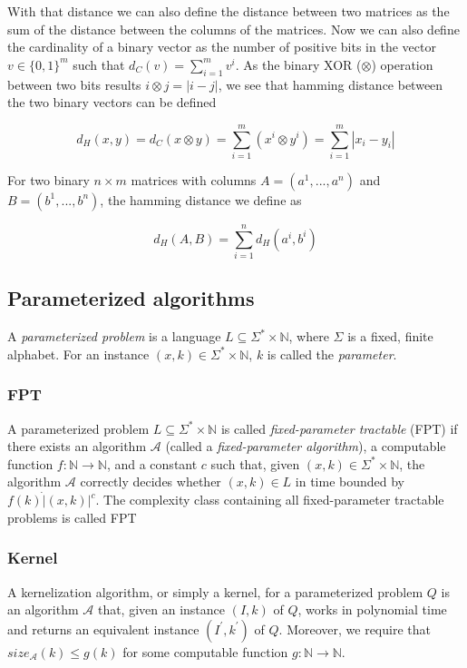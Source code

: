 \documentclass[a4paper]{article}
\begin{document}
With that distance we can
also define the distance between two matrices as the sum of the distance between the columns of
the matrices. Now we can also define the cardinality of a binary vector as the number of positive bits in
the vector $v \in \{0,1\}^m$ such that $d_C(v)=\sum_{i = 1}^{m} v^i$. As the binary XOR ($\otimes$)
operation between two bits results $i \otimes j = |i - j|$, we see that hamming distance between
the two binary vectors can be defined

\[
    d_H(x, y) = d_C(x \otimes y) =\sum_{i = 1}^{m} (x^i \otimes y^i) = \sum_{i = 1}^{m} |x_i - y_i|
\]

For two binary $n \times m$ matrices with columns $A=(a^1,...,a^n)$ and
$B=(b^1,...,b^n)$, the hamming distance we define as

\[
    d_H(A,B) = \sum_{i = 1}^{n} d_H(a^i, b^i)
\]

\subsection{Parameterized algorithms}
\begin{theoremdefinition}
    A \textit{parameterized problem} is a language $L \subseteq \Sigma^* \times \mathbb{N}$,
    where $\Sigma$ is a fixed, finite alphabet. For an instance $(x,k) \in \Sigma^* \times \mathbb{N}$,
    $k$ is called the \textit{parameter}.
\end{theoremdefinition}\cite[p.~12]{param_algo_book}

\subsubsection{FPT}
\begin{theoremdefinition}
    A parameterized problem $L \subseteq \Sigma^* \times \mathbb{N}$ is called
    \textit{fixed-parameter tractable} (FPT) if there exists an algorithm $\mathcal{A}$ (called
    a \textit{fixed-parameter algorithm}), a computable function $f:\mathbb{N} \rightarrow \mathbb{N}$,
    and a constant $c$ such that, given $(x,k) \in \Sigma^* \times \mathbb{N}$, the algorithm
    $\mathcal{A}$ correctly decides whether $(x,k) \in L$ in time bounded by $f(k) \dot |(x,k)|^c$.
    The complexity class containing all fixed-parameter tractable problems is called FPT
\end{theoremdefinition}\cite[p.~13]{param_algo_book}

\subsubsection{Kernel}
\begin{theoremdefinition}
    A kernelization algorithm, or simply a kernel, for a parameterized problem $Q$
    is an algorithm $\mathcal{A}$ that, given an instance $(I,k)$ of $Q$, works in polynomial
    time and returns an equivalent instance $(I^\prime, k^\prime)$ of $Q$. Moreover, we require
    that $size_{\mathcal{A}}(k) \leq g(k)$ for some computable function
    $g: \mathbb{N} \rightarrow \mathbb{N}$.
\end{theoremdefinition}\cite[p.~18]{param_algo_book}
\end{document}
